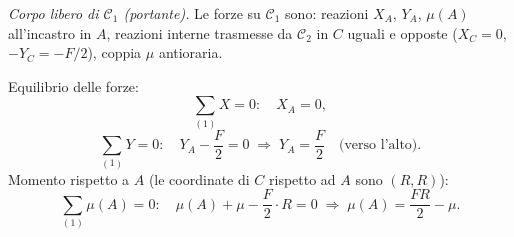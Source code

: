 \begin{esempio}
\begin{svolgimento}
		\noindent\textit{Corpo libero di $\mathcal{C}_1$
			(portante).}
		Le forze su $\mathcal{C}_1$ sono: reazioni
		$X_A$, $Y_A$, $\mu(A)$ all'incastro in $A$,
		reazioni interne trasmesse da $\mathcal{C}_2$
		in $C$ uguali e opposte ($X_C=0$, $-Y_C=-F/2$),
		coppia $\mu$ antioraria.
		
		Equilibrio delle forze:
		\[
		\sum_{(1)} X = 0:\quad X_A = 0,
		\]
		\[
		\sum_{(1)} Y = 0:\quad
		Y_A - \frac{F}{2} = 0
		\;\Longrightarrow\;
		Y_A = \frac{F}{2}
		\quad\text{(verso l'alto)}.
		\]
		Momento rispetto a $A$ (le coordinate di $C$
		rispetto ad $A$ sono $(R,R)$):
		\[
		\sum_{(1)}\mu(A) = 0:\quad
		\mu(A) + \mu
		- \frac{F}{2}\cdot R = 0
		\;\Longrightarrow\;
		\mu(A) = \frac{FR}{2} - \mu.
		\]
		
		



		
	\end{svolgimento}
\end{esempio}

